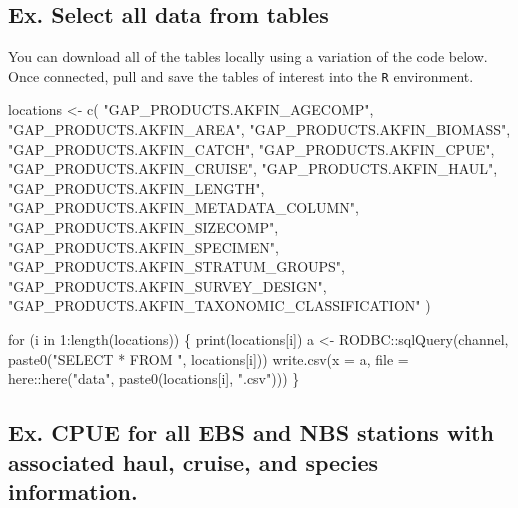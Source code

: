 \documentclass[
  letterpaper,
  oneside,
  open=any]{scrbook}
\newenvironment{Shaded}{\begin{snugshade}}{\end{snugshade}}
\newcommand{\AttributeTok}[1]{\textcolor[rgb]{0.40,0.45,0.13}{#1}}
\newcommand{\ControlFlowTok}[1]{\textcolor[rgb]{0.00,0.23,0.31}{#1}}
\newcommand{\DecValTok}[1]{\textcolor[rgb]{0.68,0.00,0.00}{#1}}
\newcommand{\FunctionTok}[1]{\textcolor[rgb]{0.28,0.35,0.67}{#1}}
\newcommand{\NormalTok}[1]{\textcolor[rgb]{0.00,0.23,0.31}{#1}}
\newcommand{\OtherTok}[1]{\textcolor[rgb]{0.00,0.23,0.31}{#1}}
\newcommand{\SpecialCharTok}[1]{\textcolor[rgb]{0.37,0.37,0.37}{#1}}
\newcommand{\StringTok}[1]{\textcolor[rgb]{0.13,0.47,0.30}{#1}}
\begin{document}
\hypertarget{ex.-select-all-data-from-tables}{%
\subsection{Ex. Select all data from
tables}\label{ex.-select-all-data-from-tables}}

You can download all of the tables locally using a variation of the code
below. Once connected, pull and save the tables of interest into the
\texttt{R} environment.

\begin{Shaded}
\begin{Highlighting}[]
\NormalTok{locations }\OtherTok{\textless{}{-}} \FunctionTok{c}\NormalTok{(}
  \StringTok{"GAP\_PRODUCTS.AKFIN\_AGECOMP"}\NormalTok{, }
  \StringTok{"GAP\_PRODUCTS.AKFIN\_AREA"}\NormalTok{, }
  \StringTok{"GAP\_PRODUCTS.AKFIN\_BIOMASS"}\NormalTok{, }
  \StringTok{"GAP\_PRODUCTS.AKFIN\_CATCH"}\NormalTok{, }
  \StringTok{"GAP\_PRODUCTS.AKFIN\_CPUE"}\NormalTok{, }
  \StringTok{"GAP\_PRODUCTS.AKFIN\_CRUISE"}\NormalTok{, }
  \StringTok{"GAP\_PRODUCTS.AKFIN\_HAUL"}\NormalTok{, }
  \StringTok{"GAP\_PRODUCTS.AKFIN\_LENGTH"}\NormalTok{, }
  \StringTok{"GAP\_PRODUCTS.AKFIN\_METADATA\_COLUMN"}\NormalTok{, }
  \StringTok{"GAP\_PRODUCTS.AKFIN\_SIZECOMP"}\NormalTok{, }
  \StringTok{"GAP\_PRODUCTS.AKFIN\_SPECIMEN"}\NormalTok{, }
  \StringTok{"GAP\_PRODUCTS.AKFIN\_STRATUM\_GROUPS"}\NormalTok{, }
  \StringTok{"GAP\_PRODUCTS.AKFIN\_SURVEY\_DESIGN"}\NormalTok{, }
  \StringTok{"GAP\_PRODUCTS.AKFIN\_TAXONOMIC\_CLASSIFICATION"}
\NormalTok{)}

\ControlFlowTok{for}\NormalTok{ (i }\ControlFlowTok{in} \DecValTok{1}\SpecialCharTok{:}\FunctionTok{length}\NormalTok{(locations)) \{}
  \FunctionTok{print}\NormalTok{(locations[i])}
\NormalTok{  a }\OtherTok{\textless{}{-}}\NormalTok{ RODBC}\SpecialCharTok{::}\FunctionTok{sqlQuery}\NormalTok{(channel, }\FunctionTok{paste0}\NormalTok{(}\StringTok{"SELECT * FROM "}\NormalTok{, locations[i]))}
  \FunctionTok{write.csv}\NormalTok{(}\AttributeTok{x =}\NormalTok{ a, }\AttributeTok{file =}\NormalTok{ here}\SpecialCharTok{::}\FunctionTok{here}\NormalTok{(}\StringTok{"data"}\NormalTok{, }\FunctionTok{paste0}\NormalTok{(locations[i], }\StringTok{".csv"}\NormalTok{)))}
\NormalTok{\}}
\end{Highlighting}
\end{Shaded}

\hypertarget{ex.-cpue-for-all-ebs-and-nbs-stations-with-associated-haul-cruise-and-species-information.}{%
\subsection{Ex. CPUE for all EBS and NBS stations with associated haul,
cruise, and species
information.}\label{ex.-cpue-for-all-ebs-and-nbs-stations-with-associated-haul-cruise-and-species-information.}}
\end{document}

